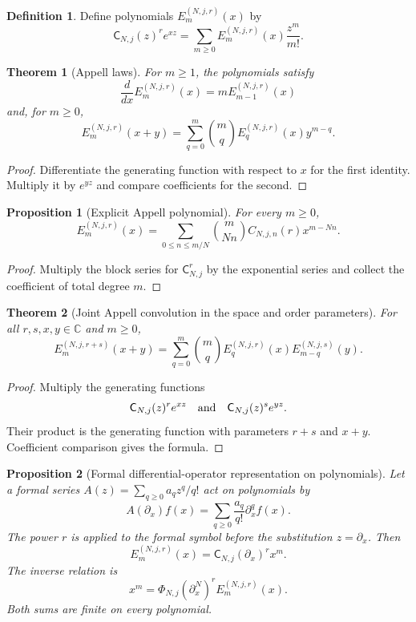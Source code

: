 \documentclass[11pt,letterpaper]{article}
\newtheorem{theorem}{Theorem}[section]
\newtheorem{proposition}[proposition]{Proposition}
\theoremstyle{definition}
\newtheorem{definition}[definition]{Definition}
\theoremstyle{remark}
\newcommand{\CC}{\mathbb C}
\newcommand{\Cfun}{\mathsf C}
\begin{document}
\begin{definition}\label{def:block_appell}
Define polynomials $E_m^{(N,j,r)}(x)$ by
\[
\Cfun_{N,j}(z)^re^{xz}
=
\sum_{m\geq0}E_m^{(N,j,r)}(x)\frac{z^m}{m!}.
\]
\end{definition}

\begin{theorem}[Appell laws]\label{thm:appell_laws}
For $m\geq1$, the polynomials satisfy
\[
\frac{d}{dx}E_m^{(N,j,r)}(x)
=
mE_{m-1}^{(N,j,r)}(x)
\]
and, for $m\geq0$,
\[
E_m^{(N,j,r)}(x+y)
=
\sum_{q=0}^{m}
\binom mq
E_q^{(N,j,r)}(x)y^{m-q}.
\]
\end{theorem}

\begin{proof}
Differentiate the generating function with respect to $x$ for the first identity.  Multiply it by $e^{yz}$ and compare coefficients for the second.
\end{proof}

\begin{proposition}[Explicit Appell polynomial]\label{prop:explicit_appell}
For every $m\geq0$,
\[
E_m^{(N,j,r)}(x)
=
\sum_{0\leq n\leq m/N}
\binom{m}{Nn}
C_{N,j,n}(r)x^{m-Nn}.
\]
\end{proposition}

\begin{proof}
Multiply the block series for $\Cfun_{N,j}^r$ by the exponential series and collect the coefficient of total degree $m$.
\end{proof}


\begin{theorem}[Joint Appell convolution in the space and order parameters]\label{thm:appell_two_parameter_convolution}
For all $r,s,x,y\in\CC$ and $m\geq0$,
\[
E_m^{(N,j,r+s)}(x+y)
=
\sum_{q=0}^{m}
\binom mq
E_q^{(N,j,r)}(x)
E_{m-q}^{(N,j,s)}(y).
\]
\end{theorem}

\begin{proof}
Multiply the generating functions
\[
\Cfun_{N,j}(z)^re^{xz}
\quad\hbox{and}\quad
\Cfun_{N,j}(z)^se^{yz}.
\]
Their product is the generating function with parameters $r+s$ and $x+y$.  Coefficient comparison gives the formula.
\end{proof}

\begin{proposition}[Formal differential-operator representation on polynomials]\label{prop:appell_operator_form}
Let a formal series $A(z)=\sum_{q\geq0}a_qz^q/q!$ act on polynomials by
\[
A(\partial_x)f(x)
=
\sum_{q\geq0}\frac{a_q}{q!}\partial_x^qf(x).
\]
The power $r$ is applied to the formal symbol before the substitution $z=\partial_x$.  Then
\[
E_m^{(N,j,r)}(x)
=
\Cfun_{N,j}(\partial_x)^r x^m.
\]
The inverse relation is
\[
x^m
=
\Phi_{N,j}(\partial_x^N)^r
E_m^{(N,j,r)}(x).
\]
Both sums are finite on every polynomial.
\end{proposition}
\end{document}
